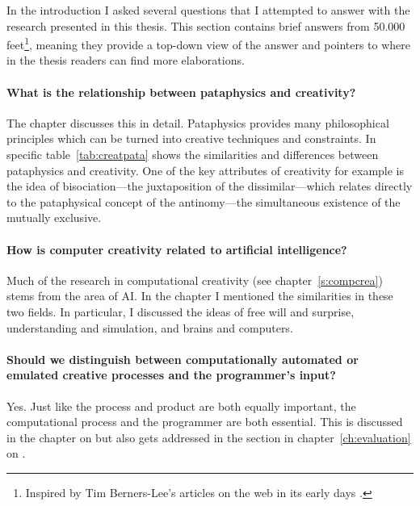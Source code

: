In the introduction I asked several questions that I attempted to answer with the research presented in this thesis. This section contains brief answers from 50.000 feet\footnote{Inspired by Tim Berners-Lee's articles on the web in its early days \autocite*{TBL1998}.}, meaning they provide a top-down view of the answer and pointers to where in the thesis readers can find more elaborations.

\paragraph{What is the relationship between pataphysics and creativity?}

The  chapter discusses this in detail. Pataphysics provides many philosophical principles which can be turned into creative techniques and constraints. In specific table~\ref{tab:creatpata} shows the similarities and differences between pataphysics and creativity. One of the key attributes of creativity for example is the idea of bisociation---the juxtaposition of the dissimilar---which relates directly to the pataphysical concept of the antinomy---the simultaneous existence of the mutually exclusive.

\paragraph{How is computer creativity related to artificial intelligence?}

Much of the research in computational creativity (see chapter~\ref{s:compcrea}) stems from the area of \ac{AI}. In the  chapter I mentioned the similarities in these two fields. In particular, I discussed the ideas of free will and surprise, understanding and simulation, and brains and computers.

\paragraph{Should we distinguish between computationally automated or emulated creative processes and the programmer's input?}

Yes. Just like the process and product are both equally important, the computational process and the programmer are both essential. This is discussed in the chapter on  but also gets addressed in the  section in chapter~\ref{ch:evaluation} on .

